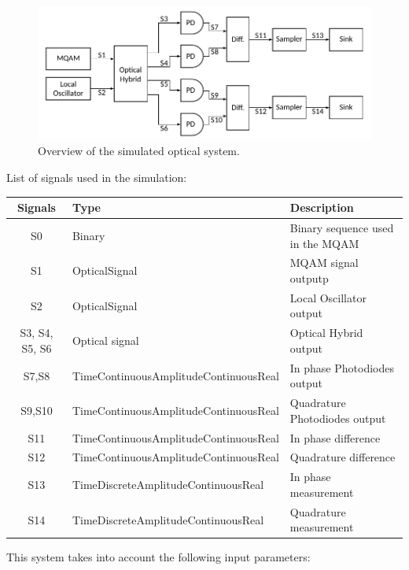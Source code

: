\begin{figure}[H]
\centering
\includegraphics[width=\linewidth]{./sdf/quantum_noise/figures/scheme_setup.pdf}
\caption{Overview of the simulated optical system.}
\label{fig:setup}
\end{figure}
%
\vspace{1em}
%
List of signals used in the simulation:
\begin{table}[H]
\centering
\begin{tabular}{|c|l|l|}
\hline
\bf{Signals}	& \bf{Type}								& \bf{Description}\\
\hline
S0				& Binary								& Binary sequence used in the MQAM\\
S1				& OpticalSignal							& MQAM signal outputp\\
S2				& OpticalSignal							& Local Oscillator output\\
S3, S4, S5, S6  & Optical signal						& Optical Hybrid output \\
S7,S8			& TimeContinuousAmplitudeContinuousReal	& In phase Photodiodes output\\
S9,S10			& TimeContinuousAmplitudeContinuousReal	& Quadrature Photodiodes output\\
S11				& TimeContinuousAmplitudeContinuousReal	& In phase difference\\
S12				& TimeContinuousAmplitudeContinuousReal	& Quadrature difference\\
S13				& TimeDiscreteAmplitudeContinuousReal	& In phase measurement\\
S14				& TimeDiscreteAmplitudeContinuousReal	& Quadrature measurement\\
\hline
\end{tabular}
\end{table}
%
\vspace{2em}
%
This system takes into account the following input parameters:
